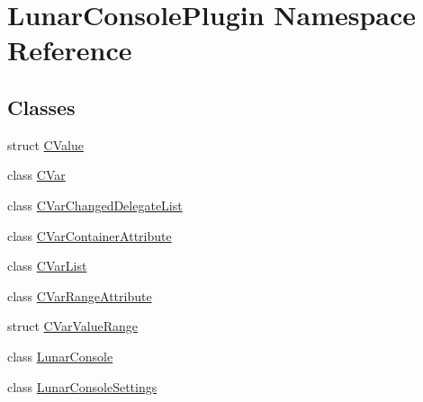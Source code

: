 \hypertarget{namespace_lunar_console_plugin}{}\section{Lunar\+Console\+Plugin Namespace Reference}
\label{namespace_lunar_console_plugin}
\subsection*{Classes}
\begin{DoxyCompactItemize}
\item 
struct \mbox{\hyperlink{struct_lunar_console_plugin_1_1_c_value}{C\+Value}}
\item 
class \mbox{\hyperlink{class_lunar_console_plugin_1_1_c_var}{C\+Var}}
\item 
class \mbox{\hyperlink{class_lunar_console_plugin_1_1_c_var_changed_delegate_list}{C\+Var\+Changed\+Delegate\+List}}
\item 
class \mbox{\hyperlink{class_lunar_console_plugin_1_1_c_var_container_attribute}{C\+Var\+Container\+Attribute}}
\item 
class \mbox{\hyperlink{class_lunar_console_plugin_1_1_c_var_list}{C\+Var\+List}}
\item 
class \mbox{\hyperlink{class_lunar_console_plugin_1_1_c_var_range_attribute}{C\+Var\+Range\+Attribute}}
\item 
struct \mbox{\hyperlink{struct_lunar_console_plugin_1_1_c_var_value_range}{C\+Var\+Value\+Range}}
\item 
class \mbox{\hyperlink{class_lunar_console_plugin_1_1_lunar_console}{Lunar\+Console}}
\item 
class \mbox{\hyperlink{class_lunar_console_plugin_1_1_lunar_console_settings}{Lunar\+Console\+Settings}}
\end{DoxyCompactItemize}

